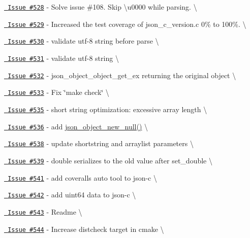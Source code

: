 \begin{DoxyItemize}
\item \href{https://github.com/json-c/json-c/issues/528}{\texttt{ Issue \#528}} -\/ Solve issue \#108. Skip \textbackslash{}u0000 while parsing. \textbackslash{}
\item \href{https://github.com/json-c/json-c/issues/529}{\texttt{ Issue \#529}} -\/ Increased the test coverage of json\+\_\+c\+\_\+version.\+c 0\% to 100\%. \textbackslash{}
\item \href{https://github.com/json-c/json-c/issues/530}{\texttt{ Issue \#530}} -\/ validate utf-\/8 string before parse \textbackslash{}
\item \href{https://github.com/json-c/json-c/issues/531}{\texttt{ Issue \#531}} -\/ validate utf-\/8 string \textbackslash{}
\item \href{https://github.com/json-c/json-c/issues/532}{\texttt{ Issue \#532}} -\/ json\+\_\+object\+\_\+object\+\_\+get\+\_\+ex returning the original object \textbackslash{}
\item \href{https://github.com/json-c/json-c/issues/533}{\texttt{ Issue \#533}} -\/ Fix \char`\"{}make check\char`\"{} \textbackslash{}
\item \href{https://github.com/json-c/json-c/issues/535}{\texttt{ Issue \#535}} -\/ short string optimization\+: excessive array length \textbackslash{}
\item \href{https://github.com/json-c/json-c/issues/536}{\texttt{ Issue \#536}} -\/ add \mbox{\hyperlink{json__object_8h_a29e23b5be729c679960242b3b81bcde0}{json\+\_\+object\+\_\+new\+\_\+null()}} \textbackslash{}
\item \href{https://github.com/json-c/json-c/issues/538}{\texttt{ Issue \#538}} -\/ update shortstring and arraylist parameters \textbackslash{}
\item \href{https://github.com/json-c/json-c/issues/539}{\texttt{ Issue \#539}} -\/ double serializes to the old value after set\+\_\+double \textbackslash{}
\item \href{https://github.com/json-c/json-c/issues/541}{\texttt{ Issue \#541}} -\/ add coveralls auto tool to json-\/c \textbackslash{}
\item \href{https://github.com/json-c/json-c/issues/542}{\texttt{ Issue \#542}} -\/ add uint64 data to json-\/c \textbackslash{}
\item \href{https://github.com/json-c/json-c/issues/543}{\texttt{ Issue \#543}} -\/ Readme \textbackslash{}
\item \href{https://github.com/json-c/json-c/issues/544}{\texttt{ Issue \#544}} -\/ Increase distcheck target in cmake \textbackslash{}

\end{DoxyItemize}
